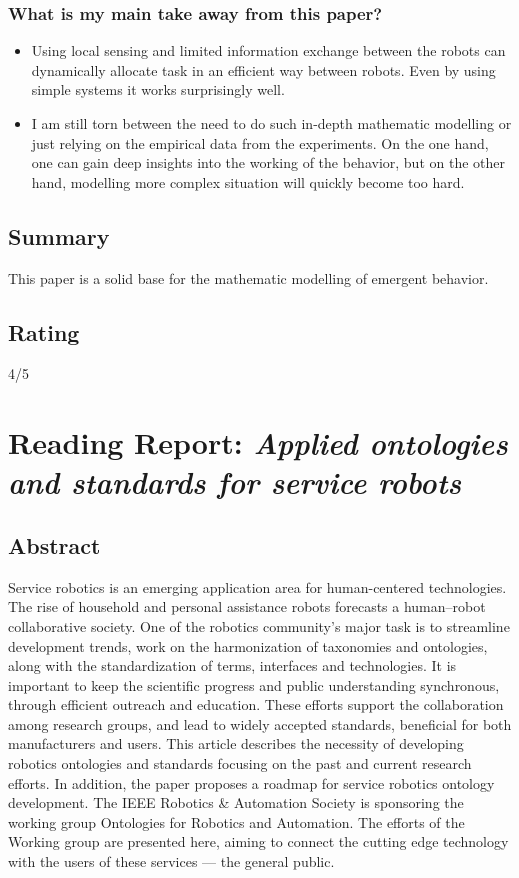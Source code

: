 \subsubsection*{What is my main take away from this paper?}
\begin{itemize}
    \item Using local sensing and limited  information exchange between the robots can dynamically allocate task in an efficient way between robots. Even by using simple systems it works surprisingly well.
    \item I am still torn between the need to do such in-depth mathematic modelling or just relying on the empirical data from the experiments. On the one hand, one can gain deep insights into the working of the behavior, but on the other hand, modelling more complex situation will quickly become too hard.
\end{itemize}

\subsection*{Summary}
This paper is a solid base for the mathematic modelling of emergent behavior.  
\subsection*{Rating}
4/5

\section{Reading Report: \emph{Applied ontologies and standards for service robots}}
\cite{Haidegger2013}

\subsection*{Abstract}
Service robotics is an emerging application area for human-centered technologies. The rise of household
and personal assistance robots forecasts a human–robot collaborative society. One of the robotics community’s major task is to streamline development trends, work on the harmonization of taxonomies and
ontologies, along with the standardization of terms, interfaces and technologies. It is important to keep
the scientific progress and public understanding synchronous, through efficient outreach and education.
These efforts support the collaboration among research groups, and lead to widely accepted standards,
beneficial for both manufacturers and users. This article describes the necessity of developing robotics ontologies and standards focusing on the past and current research efforts. In addition, the paper proposes a
roadmap for service robotics ontology development. The IEEE Robotics \& Automation Society is sponsoring
the working group Ontologies for Robotics and Automation. The efforts of the Working group are presented
here, aiming to connect the cutting edge technology with the users of these services — the general public.


